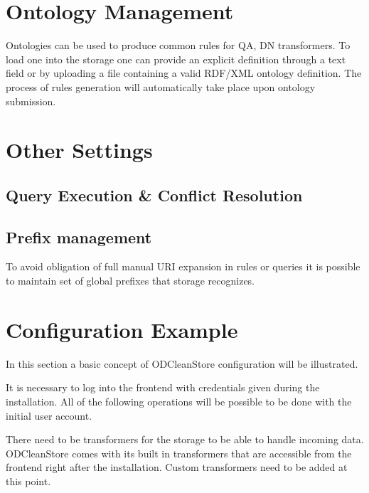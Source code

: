 \section{Ontology Management}
\label{sec:ontologyManagement}

Ontologies can be used to produce common rules for QA, DN {transformers}. To load one into the storage one can provide an explicit definition through a text field or by uploading a file containing a valid {RDF/XML} ontology definition. The process of rules generation will automatically take place upon ontology submission.

\section{Other Settings}

\subsection{Query Execution \& Conflict Resolution}
\label{sec:QEnCR}

\subsection{Prefix management}
\label{sec:frontendPrefixMgmt}

To avoid obligation of full manual URI expansion in  rules or queries it is possible to maintain set of global  prefixes that storage recognizes.

\section{Configuration Example}

In this section a basic concept of ODCleanStore configuration will be illustrated.

{

It is necessary to log into the frontend with credentials given during the installation. All of the following operations will be possible to be done with the initial user account.
}

There need to be transformers for the storage to be able to handle incoming data. ODCleanStore comes with its built in transformers that are accessible from the frontend right after the installation. Custom transformers need to be added at this point.

